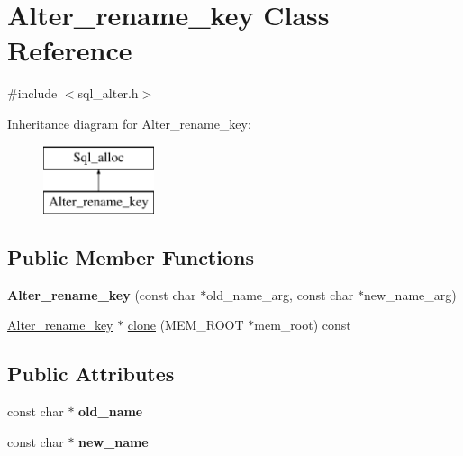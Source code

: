 \hypertarget{classAlter__rename__key}{}\section{Alter\+\_\+rename\+\_\+key Class Reference}
\label{classAlter__rename__key}


{\ttfamily \#include $<$sql\+\_\+alter.\+h$>$}

Inheritance diagram for Alter\+\_\+rename\+\_\+key\+:\begin{figure}[H]
\begin{center}
\leavevmode
\includegraphics[height=2.000000cm]{classAlter__rename__key}
\end{center}
\end{figure}
\subsection*{Public Member Functions}
\begin{DoxyCompactItemize}
\item 
\mbox{\label{classAlter__rename__key_a0c258731e6433a1bc8d91c45710e0df3}} 
{\bfseries Alter\+\_\+rename\+\_\+key} (const char $\ast$old\+\_\+name\+\_\+arg, const char $\ast$new\+\_\+name\+\_\+arg)
\item 
\mbox{\hyperlink{classAlter__rename__key}{Alter\+\_\+rename\+\_\+key}} $\ast$ \mbox{\hyperlink{classAlter__rename__key_a146d942023f6e3130ecd4e4362144d4b}{clone}} (M\+E\+M\+\_\+\+R\+O\+OT $\ast$mem\+\_\+root) const
\end{DoxyCompactItemize}
\subsection*{Public Attributes}
\begin{DoxyCompactItemize}
\item 
\mbox{\label{classAlter__rename__key_a44a2fcaa7ab99f415018525bbcc239b3}} 
const char $\ast$ {\bfseries old\+\_\+name}
\item 
\mbox{\label{classAlter__rename__key_a17ca7650641690a27099979032b86aed}} 
const char $\ast$ {\bfseries new\+\_\+name}
\end{DoxyCompactItemize}
